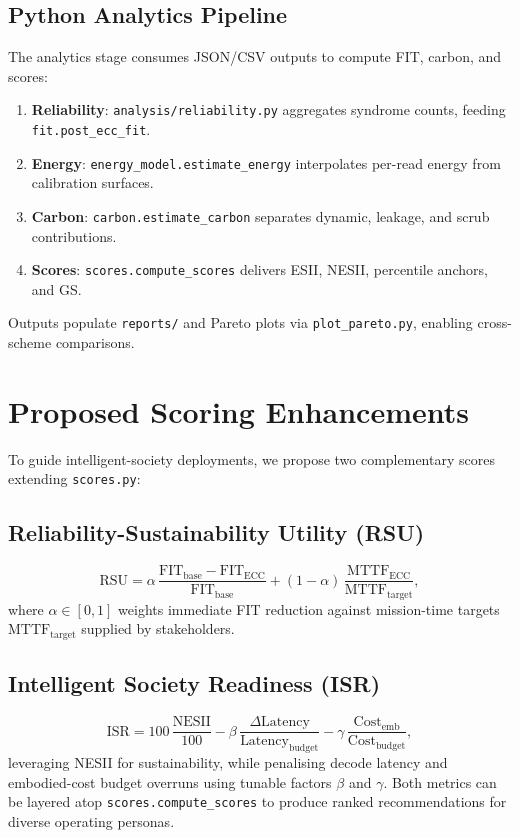 \documentclass[conference]{IEEEtran}
\begin{document}
\subsection{Python Analytics Pipeline}
The analytics stage consumes JSON/CSV outputs to compute FIT, carbon, and scores:
\begin{enumerate}
    \item \textbf{Reliability}: \texttt{analysis/reliability.py} aggregates syndrome counts, feeding \texttt{fit.post\_ecc\_fit}.
    \item \textbf{Energy}: \texttt{energy\_model.estimate\_energy} interpolates per-read energy from calibration surfaces.
    \item \textbf{Carbon}: \texttt{carbon.estimate\_carbon} separates dynamic, leakage, and scrub contributions.
    \item \textbf{Scores}: \texttt{scores.compute\_scores} delivers ESII, NESII, percentile anchors, and GS.
\end{enumerate}
Outputs populate \texttt{reports/} and Pareto plots via \texttt{plot\_pareto.py}, enabling cross-scheme comparisons.
\section{Proposed Scoring Enhancements}
To guide intelligent-society deployments, we propose two complementary scores extending \texttt{scores.py}:
\subsection{Reliability-Sustainability Utility (RSU)}
\begin{equation}
    \text{RSU} = \alpha\,\frac{\text{FIT}_{\text{base}}-\text{FIT}_{\text{ECC}}}{\text{FIT}_{\text{base}}} + (1-\alpha)\,\frac{\text{MTTF}_{\text{ECC}}}{\text{MTTF}_{\text{target}}},
\end{equation}
where $\alpha\in[0,1]$ weights immediate FIT reduction against mission-time targets $\text{MTTF}_{\text{target}}$ supplied by stakeholders.
\subsection{Intelligent Society Readiness (ISR)}
\begin{equation}
    \text{ISR} = 100\,\frac{\text{NESII}}{100} - \beta\,\frac{\Delta \text{Latency}}{\text{Latency}_{\text{budget}}} - \gamma\,\frac{\text{Cost}_{\text{emb}}}{\text{Cost}_{\text{budget}}},
\end{equation}
leveraging NESII for sustainability, while penalising decode latency and embodied-cost budget overruns using tunable factors $\beta$ and $\gamma$.
Both metrics can be layered atop \texttt{scores.compute\_scores} to produce ranked recommendations for diverse operating personas.
\end{document}

